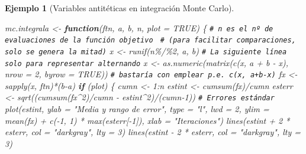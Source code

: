 \documentclass[
  10pt,
]{book}
\newenvironment{Shaded}{\begin{snugshade}}{\end{snugshade}}
\newcommand{\AttributeTok}[1]{\textcolor[rgb]{0.77,0.63,0.00}{#1}}
\newcommand{\CommentTok}[1]{\textcolor[rgb]{0.56,0.35,0.01}{\textit{#1}}}
\newcommand{\ConstantTok}[1]{\textcolor[rgb]{0.00,0.00,0.00}{#1}}
\newcommand{\ControlFlowTok}[1]{\textcolor[rgb]{0.13,0.29,0.53}{\textbf{#1}}}
\newcommand{\DecValTok}[1]{\textcolor[rgb]{0.00,0.00,0.81}{#1}}
\newcommand{\FunctionTok}[1]{\textcolor[rgb]{0.00,0.00,0.00}{#1}}
\newcommand{\NormalTok}[1]{#1}
\newcommand{\OtherTok}[1]{\textcolor[rgb]{0.56,0.35,0.01}{#1}}
\newcommand{\SpecialCharTok}[1]{\textcolor[rgb]{0.00,0.00,0.00}{#1}}
\newcommand{\StringTok}[1]{\textcolor[rgb]{0.31,0.60,0.02}{#1}}
\theoremstyle{break}
\newtheorem{example}{Ejemplo}[chapter]
\theoremstyle{nonumberplain}
\renewcommand{\CommentTok}[1]{\textcolor[rgb]{0.41,0.41,0.41}{\texttt{#1}}}
\begin{document}
\begin{example}[Variables antitéticas en integración Monte Carlo]
\begin{Shaded}
\begin{Highlighting}[]
\NormalTok{mc.integrala }\OtherTok{\textless{}{-}} \ControlFlowTok{function}\NormalTok{(ftn, a, b, n, }\AttributeTok{plot =} \ConstantTok{TRUE}\NormalTok{) \{}
  \CommentTok{\# n es el nº de evaluaciones de la función objetivo }
  \CommentTok{\# (para facilitar comparaciones, solo se genera la mitad)}
\NormalTok{  x }\OtherTok{\textless{}{-}} \FunctionTok{runif}\NormalTok{(n}\SpecialCharTok{\%/\%}\DecValTok{2}\NormalTok{, a, b)}
  \CommentTok{\# La siguiente línea solo para representar alternando}
\NormalTok{  x }\OtherTok{\textless{}{-}} \FunctionTok{as.numeric}\NormalTok{(}\FunctionTok{matrix}\NormalTok{(}\FunctionTok{c}\NormalTok{(x, a }\SpecialCharTok{+}\NormalTok{ b }\SpecialCharTok{{-}}\NormalTok{ x), }\AttributeTok{nrow =} \DecValTok{2}\NormalTok{, }\AttributeTok{byrow =} \ConstantTok{TRUE}\NormalTok{))}
  \CommentTok{\# bastaría con emplear p.e. c(x, a+b{-}x)}
\NormalTok{  fx }\OtherTok{\textless{}{-}} \FunctionTok{sapply}\NormalTok{(x, ftn)}\SpecialCharTok{*}\NormalTok{(b}\SpecialCharTok{{-}}\NormalTok{a)}
  \ControlFlowTok{if}\NormalTok{ (plot) \{}
\NormalTok{    cumn }\OtherTok{\textless{}{-}} \DecValTok{1}\SpecialCharTok{:}\NormalTok{n}
\NormalTok{    estint }\OtherTok{\textless{}{-}} \FunctionTok{cumsum}\NormalTok{(fx)}\SpecialCharTok{/}\NormalTok{cumn}
\NormalTok{    esterr }\OtherTok{\textless{}{-}} \FunctionTok{sqrt}\NormalTok{((}\FunctionTok{cumsum}\NormalTok{(fx}\SpecialCharTok{\^{}}\DecValTok{2}\NormalTok{)}\SpecialCharTok{/}\NormalTok{cumn }\SpecialCharTok{{-}}\NormalTok{ estint}\SpecialCharTok{\^{}}\DecValTok{2}\NormalTok{)}\SpecialCharTok{/}\NormalTok{(cumn}\DecValTok{{-}1}\NormalTok{)) }\CommentTok{\# Errores estándar}
    \FunctionTok{plot}\NormalTok{(estint, }\AttributeTok{ylab =} \StringTok{"Media y rango de error"}\NormalTok{, }\AttributeTok{type =} \StringTok{"l"}\NormalTok{, }\AttributeTok{lwd =} \DecValTok{2}\NormalTok{, }
         \AttributeTok{ylim =} \FunctionTok{mean}\NormalTok{(fx) }\SpecialCharTok{+} \FunctionTok{c}\NormalTok{(}\SpecialCharTok{{-}}\DecValTok{1}\NormalTok{, }\DecValTok{1}\NormalTok{) }\SpecialCharTok{*} \FunctionTok{max}\NormalTok{(esterr[}\SpecialCharTok{{-}}\DecValTok{1}\NormalTok{]), }\AttributeTok{xlab =} \StringTok{"Iteraciones"}\NormalTok{)}
    \FunctionTok{lines}\NormalTok{(estint }\SpecialCharTok{+} \DecValTok{2} \SpecialCharTok{*}\NormalTok{ esterr, }\AttributeTok{col =} \StringTok{"darkgray"}\NormalTok{, }\AttributeTok{lty =} \DecValTok{3}\NormalTok{)}
    \FunctionTok{lines}\NormalTok{(estint }\SpecialCharTok{{-}} \DecValTok{2} \SpecialCharTok{*}\NormalTok{ esterr, }\AttributeTok{col =} \StringTok{"darkgray"}\NormalTok{, }\AttributeTok{lty =} \DecValTok{3}\NormalTok{)}

\end{Highlighting}
\end{Shaded}
\end{example}
\end{document}
